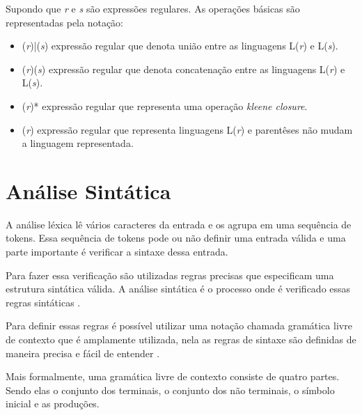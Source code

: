 Supondo que \textit{r} e \textit{s} são expressões regulares. As operações básicas 
são representadas pela notação:

\begin{itemize}
    \item (\textit{r})|(\textit{s}) expressão regular que denota união entre as linguagens L(\textit{r}) e 
    L(\textit{s}).
    \item (\textit{r})(\textit{s}) expressão regular que denota concatenação entre as linguagens L(\textit{r}) e 
    L(\textit{s}).
    \item (\textit{r})* expressão regular que representa uma operação \textit{kleene closure}.
    \item (\textit{r}) expressão regular que representa linguagens L(\textit{r}) e parentêses não mudam
    a linguagem representada.    
\end{itemize}


\section{Análise Sintática}
\label{sec:sintatic}

A análise léxica lê vários caracteres da entrada e os agrupa em uma sequência de tokens. Essa sequência de
tokens pode ou não definir uma entrada válida e uma parte importante é verificar a sintaxe dessa entrada.

Para fazer essa verificação são utilizadas regras precisas que especificam uma estrutura sintática válida.
A análise sintática é o processo onde é verificado essas regras sintáticas \cite{aho2006}. 

Para definir essas regras é possível utilizar uma notação chamada gramática livre de contexto que é amplamente
utilizada, nela as regras de sintaxe são definidas de maneira precisa e fácil de entender \cite{aho2006}.

Mais formalmente, uma gramática livre de contexto consiste de quatro partes. Sendo elas
o conjunto dos terminais, o conjunto dos não terminais, o símbolo inicial e as produções.

